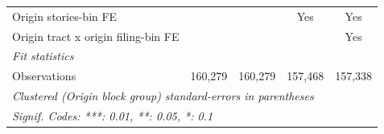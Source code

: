 \begin{tabular}{lcccc}
   Origin stories-bin FE                           &                &                & Yes            & Yes\\  
   Origin tract x origin filing-bin FE             &                &                &                & Yes\\  
   \midrule
   \emph{Fit statistics}\\
   Observations                                    & 160,279        & 160,279        & 157,468        & 157,338\\  
   \midrule \midrule
   \multicolumn{5}{l}{\emph{Clustered (Origin block group) standard-errors in parentheses}}\\
   \multicolumn{5}{l}{\emph{Signif. Codes: ***: 0.01, **: 0.05, *: 0.1}}\\
\end{tabular}
\par\endgroup
